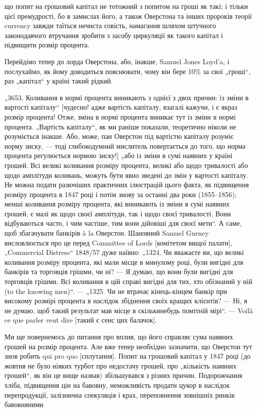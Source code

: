 \parcont{}  %
що попит на грошовий капітал не тотожний з попитом на гроші
як такі; і тільки цієї премудрості, бо в замислах його, а також
Оверстона та інших пророків теорії currency завжди таїться нечиста совість, намагання шляхом
штучного законодавчого втручання зробити з засобу циркуляції як такого капітал і підвищити
розмір процента.

Перейдімо тепер до лорда Оверстона, або, інакше, Samuel
Jones Loyd’a, і послухаймо, як йому доводиться пояснювати, чому
він бере 10\% за свої „гроші“, раз „капітал“ у країні такий
рідкий.

„3653. Коливання в нормі процента виникають з однієї з двох
причин: із зміни в вартості капіталу“ [чудесно! адже вартість
капіталу, взагалі кажучи, і є якраз розмір процента! Отже, зміна
в нормі процента виникає тут із зміни в нормі процента. „Вартість капіталу“, як ми раніше показали,
теоретично ніколи не
розуміється інакше. Або, може, пан Оверстон під вартістю
капіталу розуміє норму зиску, — тоді глибокодумний мислитель
повертається до того, що норма процента регулюється нормою
зиску!] „або із зміни в сумі наявних у країні грошей. Всі великі
коливання розміру процента, великі або щодо тривалості або
щодо амплітуди коливань, можуть бути явно зведені до змін
у вартості капіталу. Не можна подати разючіших практичних ілюстрацій цього факта, як підвищення
розміру процента в 1847 році
і потім знову за останні два роки (1855--1856); менші коливання
розміру процента, які виникають із зміни в сумі наявних грошей,
є малі як щодо своєї амплітуди, так і щодо своєї тривалості. Вони
відбуваються часто, і чим частіше, тим вони дійовіші для своєї
мети“. А саме, щоб збагачувати банкірів à la Оверстон. Шановний Samuel Gurney висловлюється про це
перед Committee of
Lords [комітетом вищої палати], „Commercial Distress“ 1848/57 дуже
наївно: „1324. Чи вважаєте ви, що великі коливання розміру
процента, які мали місце в минулому році, були вигідні для
банкірів та торговців грішми, чи ні? — Я думаю, що вони були
вигідні для торговців грішми. Всі коливання в цій справі вигідні
для тих, хто обізнаний у ній (to the knowing men)“. — „1325. Чи не
втрачає кінець-кінцем банкір при високому розмірі процента
в наслідок збіднення своїх кращих клієнтів? — Ні, я не думаю,
щоб такий результат мав місце в скількинебудь помітній мірі“. — Voilà ce que parler veut dire
[такий є сенс цих балачок].

Ми ще повернемось до питання про вплив, що його справляє
сума наявних грошей на розмір процента. Але вже тепер необхідно зазначити, що Оверстон тут знов
робить qui pro quo [сплутання]. Попит на грошовий капітал у 1847 році (до жовтня не
було ніяких турбот про недостачу грошей, про „кількість
наявних грошей“, як він це вище назвав) збільшувався з різних
причин. Подорожчання хліба, підвищення цін на бавовну, неможливість продати цукор в наслідок
перепродукції, залізнична
спекуляція і крах, переповнення зовнішніх ринків бавовняними
\parbreak{}  %
